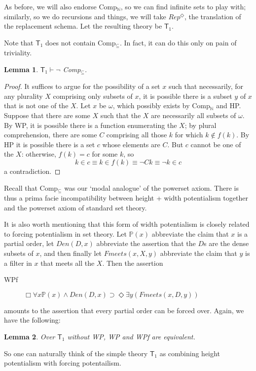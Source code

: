 \documentclass{article}
\newtheorem{lemma}{Lemma}
\begin{document}
As before, we will also endorse Comp$_\mathbb{N}$, so we can find infinite 
sets to play with; similarly, so we do recursions and things, we will 
take $Rep^\Diamond$, the translation of the replacement schema. Let the resulting theory 
be $\mathsf{T}_1$.

Note that $\mathsf{T}_1$ does not contain Comp$_\subseteq$. In fact, it can 
do this only on pain of triviality.

\begin{lemma}
$\mathsf{T}_1 \vdash \neg$ Comp$_\subseteq$.
\end{lemma}
\begin{proof}
    It suffices to argue for the possibility of a set $x$ such that necessarily, 
    for any plurality $X$ comprising only subsets of $x$, it is possible there is a 
    subset $y$ of $x$ that is not one of the $X$. Let $x$ be $\omega$, which 
    possibly exists by Comp$_\mathbb{N}$ and HP. Suppose that there are some $X$ such 
    that the $X$ are necessarily all subsets of $\omega$. By WP, it is possible 
    there is a function enumerating the $X$; by plural comprehension, there are 
    some $C$ comprising all those $k$ for which $k \not \in f(k)$. By HP it is possible 
    there is a set $c$ whose elements are $C$. But $c$ cannot be one of the $X$: 
    otherwise, $f(k) = c$ for some $k$, so
    $$k \in c \equiv k \in f(k) \equiv \neg Ck \equiv \neg k \in c$$
    a contradiction. 
\end{proof}
Recall that Comp$_\subseteq$ was our `modal analogue' of the powerset axiom. There is thus 
a prima facie incompatibility between height + width potentialism together and 
the powerset axiom of standard set theory. 

It is also worth mentioning that this form of width potentialism is closely related 
to forcing potentialism in set theory. Let $\mathbb{P}(x)$ abbreviate the claim 
that $x$ is a partial order, let $Den(D, x)$ abbreviate the assertion that the $D$s 
are the dense subsets of $x$, and then finally let $Fmeets(x, X, y)$ abbreviate the 
claim that $y$ is a filter in $x$ that meets all the $X$. Then the assertion
\begin{description}
    \item[WPf] $\Box \forall x \mathbb{P}(x) \wedge Den(D, x) \supset \Diamond \exists y (Fmeets(x, D, y))$
\end{description}
amounts to the assertion that every partial order can be forced over. Again, we have 
the following:
\begin{lemma}
    Over $\mathsf{T}_1$ without WP, WP and WPf are equivalent.
\end{lemma}
So one can naturally think of the simple theory $\mathsf{T}_1$ as combining height 
potentialism with forcing potentailism. 
\end{document}

